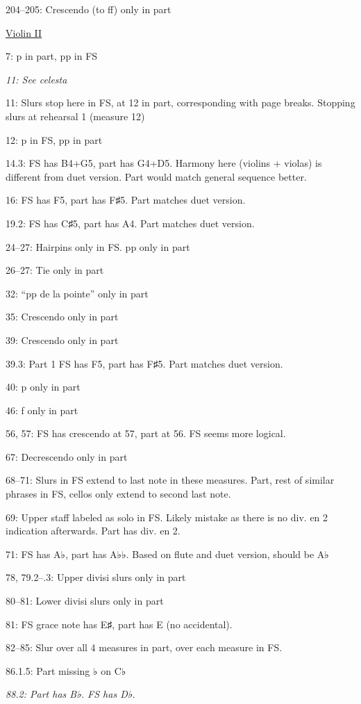\documentclass[twoside]{article}
\begin{document}
\begin{hangparas}{15pt}{1}
\begin{multicols}{2}
204--205: Crescendo (to ff) only in part

\underline{Violin II}

7: p in part, pp in FS

\textit{11: See celesta}

11: Slurs stop here in FS, at 12 in part, corresponding with page breaks. Stopping slurs at rehearsal 1 (measure 12)

12: p in FS, pp in part

14.3: FS has B4+G5, part has G4+D5. Harmony here (violins + violas) is different from duet version. Part would match general sequence better.

16: FS has F5, part has F♯5. Part matches duet version.

19.2: FS has C♯5, part has A4. Part matches duet version.

24--27: Hairpins only in FS. pp only in part

26--27: Tie only in part

32: ``pp de la pointe'' only in part

35: Crescendo only in part

39: Crescendo only in part

39.3: Part 1 FS has F5, part has F♯5. Part matches duet version.

40: p only in part

46: f only in part

56, 57: FS has crescendo at 57, part at 56. FS seems more logical.

67: Decrescendo only in part

68--71: Slurs in FS extend to last note in these measures. Part, rest of similar phrases in FS, cellos only extend to second last note.

69: Upper staff labeled as solo in FS. Likely mistake as there is no div. en 2 indication afterwards. Part has div. en 2.

71: FS has A♭, part has A♭♭. Based on flute and duet version, should be A♭

78, 79.2--.3: Upper divisi slurs only in part

80--81: Lower divisi slurs only in part

81: FS grace note has E♯, part has E (no accidental).

82--85: Slur over all 4 measures in part, over each measure in FS.

86.1.5: Part missing ♭ on C♭

\textit{88.2: Part has B♭. FS has D♭.}


\end{multicols}
\end{hangparas}
\end{document}
